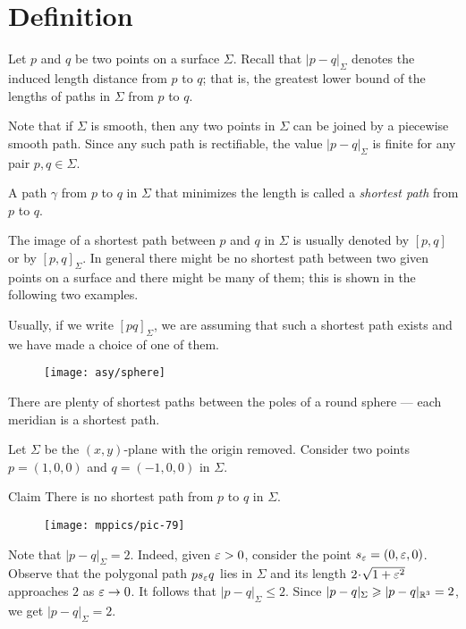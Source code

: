 \section{Definition}

Let $p$ and $q$ be two points on a surface $\Sigma$.
Recall that $|p-q|_\Sigma$ denotes the induced length distance from $p$ to $q$;
that is, the greatest lower bound of the lengths of paths in $\Sigma$ from $p$ to $q$.

Note that if $\Sigma$ is smooth, then any two points in $\Sigma$ can be joined by a piecewise smooth path.
Since any such path is rectifiable, the value $|p-q|_\Sigma$ is finite for any pair $p,q\in\Sigma$.

A path $\gamma$ from $p$ to $q$ in $\Sigma$ that minimizes the length is called a \emph{shortest path} from $p$ to $q$.

The image of a shortest path between $p$ and $q$ in $\Sigma$ is usually denoted by $[p,q]$ or by $[p,q]_\Sigma$.
In general there might be no shortest path between two given points on a surface and there might be many of them;
this is shown in the following two examples.

Usually, if we write $[pq]_\Sigma$, we are assuming that such a shortest path exists and we have made a choice of one of them.

{

\begin{wrapfigure}{r}{28 mm}
\vskip-6mm
\centering
\texttt{[image: asy/sphere]}
\end{wrapfigure}

 There are plenty of shortest paths between the poles of a round sphere --- each meridian is a shortest path.

 Let $\Sigma$ be the $(x,y)$-plane with the origin removed.
Consider two points $p=(1,0,0)$ and $q=(-1,0,0)$ in $\Sigma$.

}

\begin{thm}{Claim}
There is no shortest path from $p$ to $q$ in $\Sigma$.
\end{thm}

\begin{wrapfigure}{r}{28 mm}
\vskip-4mm
\centering
\texttt{[image: mppics/pic-79]}
\end{wrapfigure}

Note that $|p-q|_\Sigma=2$. 
Indeed, given $\eps\z>0$, consider the point $s_\varepsilon=(0,\varepsilon,0)$.
Observe that the polygonal path $ps_\varepsilon q$ lies in $\Sigma$ and its length $2\cdot\sqrt{1+\eps^2}$ approaches $2$ as $\varepsilon\to0$.
It follows that $|p-q|_\Sigma\le 2$.
Since $|p-q|_\Sigma\z\ge |p-q|_{\RR^3}=2$, we get $|p-q|_\Sigma=2$.


